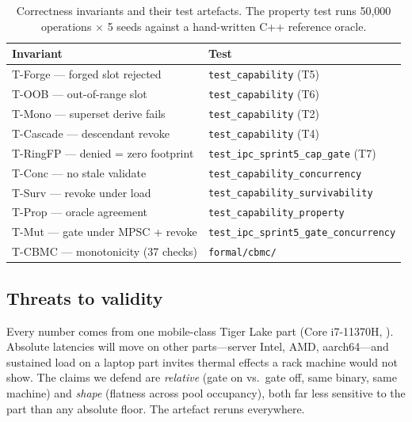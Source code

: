 \begin{table}[t]
\centering\scriptsize
\setlength{\tabcolsep}{3pt}
\begin{tabular}{ll}
\toprule
Invariant                          & Test \\
\midrule
T-Forge --- forged slot rejected     & \texttt{test\_capability} (T5) \\
T-OOB --- out-of-range slot          & \texttt{test\_capability} (T6) \\
T-Mono --- superset derive fails      & \texttt{test\_capability} (T2) \\
T-Cascade --- descendant revoke       & \texttt{test\_capability} (T4) \\
T-RingFP --- denied = zero footprint  & \texttt{test\_ipc\_sprint5\_cap\_gate} (T7) \\
T-Conc --- no stale validate         & \texttt{test\_capability\_concurrency} \\
T-Surv --- revoke under load         & \texttt{test\_capability\_survivability} \\
T-Prop --- oracle agreement          & \texttt{test\_capability\_property} \\
T-Mut --- gate under MPSC + revoke   & \texttt{test\_ipc\_sprint5\_gate\_concurrency} \\
T-CBMC --- monotonicity (37 checks)  & \texttt{formal/cbmc/} \\
\bottomrule
\end{tabular}
\caption{Correctness invariants and their test artefacts. The
property test runs 50,000 operations $\times$ 5 seeds against a
hand-written C++ reference oracle.}
\label{tab:tests}
\end{table}

\subsection{Threats to validity}
\label{sec:eval:threats}

 Every number comes from one
mobile-class Tiger Lake part (Core i7-11370H, ).
Absolute latencies will move on other parts---server Intel,
AMD, aarch64---and sustained load on a laptop part invites thermal
effects a rack machine would not show. The claims we defend are
\emph{relative} (gate on vs.\ gate off, same binary, same machine)
and \emph{shape} (flatness across pool occupancy), both far less
sensitive to the part than any absolute floor. The artefact reruns
everywhere.

